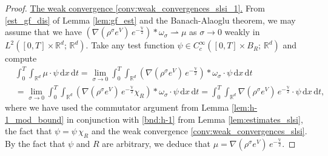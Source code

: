 \documentclass[reqno, 11pt]{amsart}
\numberwithin{equation}{section}
\theoremstyle{definition}
\begin{document}
\begin{proof}
    \underline{The weak convergence \ref{conv:weak_convergences_slsi_1}.} From \ref{est_gf_dis} of Lemma \ref{lem:gf_est} and the Banach-Alaoglu theorem, we may assume that we have $(\nabla (\rho^\sigma e^V)\, e^{-\frac{\mathbb{V}}{2}})\ast\omega_\sigma\rightharpoonup \mu$ as $\sigma\rightarrow 0$ weakly in $L^2([0,T]\times \mathbb{R}^{d};\,\mathbb{R}^{d})$. Take any test function $\psi\in C_c^\infty([0,T]\times B_R;\,\mathbb{R}^{d})$ and compute
    \begin{align*}
        &\int_0^T \int_{\mathbb{R}^{d}} \mu\cdot\psi\,\mathrm{d} x\,\mathrm{d} t
        =\lim_{\sigma\rightarrow 0}\int_0^T \int_{\mathbb{R}^{d}} (\nabla (\rho^\sigma e^V)\, e^{-\frac{\mathbb{V}}{2}})\ast\omega_\sigma\cdot\psi\,\mathrm{d} x\,\mathrm{d} t\\
        &=\lim_{\sigma\rightarrow 0}\int_0^T \int_{\mathbb{R}^{d}} (\nabla (\rho^\sigma e^V)\, e^{-\frac{\mathbb{V}}{2}}\chi_R)\ast\omega_\sigma\cdot\psi\,\mathrm{d} x\,\mathrm{d} t
        =\int_0^T \int_{\mathbb{R}^{d}} \nabla (\rho^\sigma e^V)\, e^{-\frac{\mathbb{V}}{2}}\cdot\psi\,\mathrm{d} x\,\mathrm{d} t,
    \end{align*}
    where we have used the commutator argument from Lemma \ref{lem:h-1_mod_bound} in conjunction with \ref{bnd:h-1} from Lemma \ref{lem:estimates_slsi}, the fact that $\psi=\psi\, \chi_R$ and the weak convergence \ref{conv:weak_convergences_slsi}. By the fact that $\psi$ and $R$ are arbitrary, we deduce that $\mu=\nabla (\rho^\sigma e^V)\, e^{-\frac{\mathbb{V}}{2}}$.
\end{proof}
\end{document}

